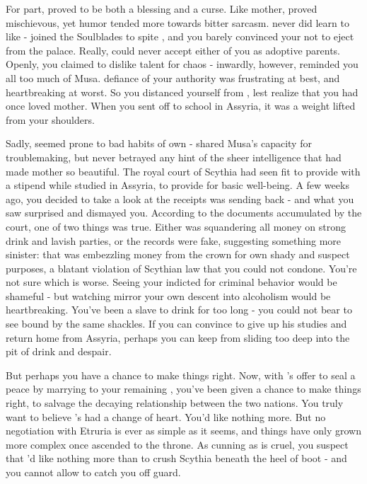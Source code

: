 \documentclass[char]{Kos}
\begin{document}
For \cWard{\their} part, \cWard{} proved to be both a blessing and a curse. Like \cWard{\their} mother, \cWard{\they} proved mischievous, yet \cWard{\their} humor tended more towards bitter sarcasm. \cWard{\They} never did learn to like \cScythiaQueen{} - \cWard{\they} joined the Soulblades to spite \cScythiaQueen{\them}, and you barely convinced your \cScythiaQueen{\spouse} not to eject \cWard{\them} from the palace. Really, \cWard{\they} could never accept either of you as \cWard{\their} adoptive parents. Openly, you claimed to dislike \cWard{\their} talent for chaos - inwardly, however, \cWard{\they} reminded you all too much of Musa. \cWard{\Their} defiance of your authority was frustrating at best, and heartbreaking at worst. So you distanced yourself from \cWard{\them}, lest \cScythiaQueen{} realize that you had once loved \cWard{\their} mother. When you sent \cWard{} off to school in Assyria, it was a weight lifted from your shoulders.

Sadly, \cWard{} seemed prone to bad habits of \cWard{\their} own - \cWard{\they} shared Musa's capacity for troublemaking, but never betrayed any hint of the sheer intelligence that had made \cWard{\their} mother so beautiful. The royal court of Scythia had seen fit to provide  with a stipend while \cWard{\they} studied in Assyria, to provide for \cWard{\their} basic well-being. A few weeks ago, you decided to take a look at the receipts \cWard{} was sending back - and what you saw surprised and dismayed you. According to the documents accumulated by the court, one of two things was true. Either \cWard{} was squandering all \cWard{\their} money on strong drink and lavish parties, or the records were fake, suggesting something more sinister: that \cWard{\they} was embezzling money from the crown for \cWard{\their} own shady and suspect purposes, a blatant violation of Scythian law that you could not condone. You're not sure which is worse. Seeing your \cWard{\offspring} indicted for criminal behavior would be shameful - but watching \cWard{\them} mirror your own descent into alcoholism would be heartbreaking. You've been a slave to drink for too long - you could not bear to see \cWard{\them} bound by the same shackles. If you can convince \cWard{\them} to give up his studies and return home from Assyria, perhaps you can keep \cWard{\them} from sliding too deep into the pit of drink and despair.

But perhaps you have a chance to make things right. Now, with \cEtruriaKing{\Monarch} \cEtruriaKing{}'s offer to seal a peace by marrying \cEtruriaKing{\their} \cGroom{\offspring} \cGroom{} to your remaining \cBride{\offspring} \cBride{}, you've been given a chance to make things right, to salvage the decaying relationship between the two nations. You truly want to believe \cEtruriaKing{\they}'s had a change of heart. You'd like nothing more. But no negotiation with Etruria is ever as simple as it seems, and things have only grown more complex once \cEtruriaKing{} ascended to the throne. As cunning as \cEtruriaKing{\they} is cruel, you suspect that \cEtruriaKing{\they}'d like nothing more than to crush Scythia beneath the heel of \cEtruriaKing{\their} boot - and you cannot allow \cEtruriaKing{\them} to catch you off guard. 
\end{document}

